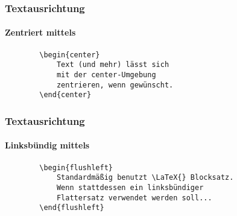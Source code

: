 \begin{frame}[fragile]
    \frametitle{Textausrichtung}
    \framesubtitle{Zentriert mittels }

    \begin{center}
    \end{center}
    
    \begin{center}
        \begin{verbatim}
        \begin{center}
            Text (und mehr) lässt sich
            mit der center-Umgebung
            zentrieren, wenn gewünscht.
        \end{center}
        \end{verbatim}
    \end{center}
\end{frame}


\begin{frame}[fragile]
    \frametitle{Textausrichtung}
    \framesubtitle{Linksbündig mittels }

    \begin{center}
    \end{center}
    
    \begin{center}
        \begin{verbatim}
        \begin{flushleft}
            Standardmäßig benutzt \LaTeX{} Blocksatz.
            Wenn stattdessen ein linksbündiger
            Flattersatz verwendet werden soll...
        \end{flushleft}
        \end{verbatim}
    \end{center}
\end{frame}


